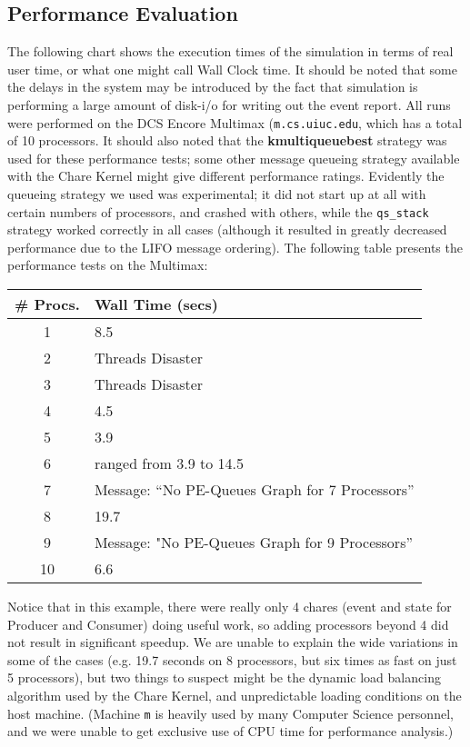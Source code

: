 \subsection {Performance Evaluation}
The following chart shows the execution times of the simulation in terms of
real user time, or what one might call Wall Clock time.  It should
be noted that some the delays in the system may be introduced by
the fact that simulation is performing a large amount of disk-i/o
for writing out the event report. All runs were performed on
the DCS Encore Multimax ({\tt m.cs.uiuc.edu}, which has a total of
10 processors.  It should also noted that the {\bf kmultiqueuebest}
strategy was used for these performance tests; some other
message queueing strategy available with the Chare Kernel might give different
performance ratings. Evidently the queueing strategy we used was
experimental; it did not start up at all with certain numbers of
processors, and crashed with others, while the {\tt qs\_stack} strategy
worked correctly in all cases (although it resulted in greatly decreased
performance due to the LIFO message ordering).
The following table presents the performance
tests on the Multimax:

\begin{tabular}{||c|l||} \hline
  \# Procs.  &   Wall Time (secs)  \\ \hline
1  &	8.5 \\
2  &	Threads Disaster \\
3  &	Threads Disaster \\
4  &	4.5 \\
5  &	3.9 \\
6  &	ranged from 3.9 to 14.5 \\
7  &	Message: ``No PE-Queues Graph for 7 Processors'' \\
8  &	19.7 \\
9  &    Message: "No PE-Queues Graph for 9 Processors'' \\
10 &	6.6 \\ \hline
\end{tabular}

Notice that in this example, there were really only 4 chares (event and
state for Producer and Consumer) doing useful work, so adding processors
beyond 4 did not result in significant speedup.  We are unable to
explain the wide variations in some of the cases (e.g. 19.7 seconds on 8
processors, but six times as fast on just 5 processors), but two things
to suspect might be the dynamic load balancing algorithm used by the
Chare Kernel, and unpredictable loading conditions on the host machine.
(Machine {\tt m} is heavily used by many Computer Science personnel, and
we were unable to get exclusive use of CPU time for performance analysis.)

